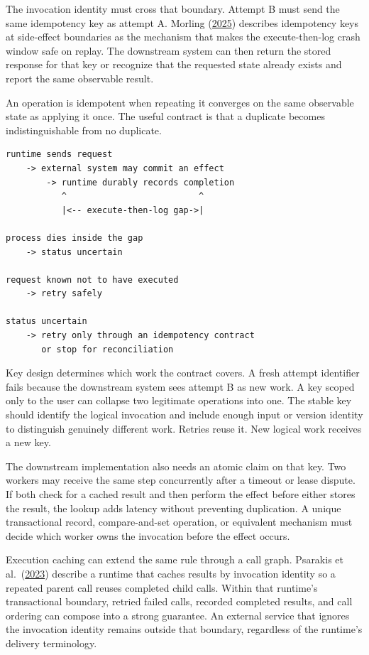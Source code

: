 The invocation identity must cross that boundary. Attempt B must send the same idempotency key as attempt A. Morling (\href{https://www.morling.dev/blog/building-durable-execution-engine-with-sqlite/}{2025}) describes idempotency keys at side-effect boundaries as the mechanism that makes the execute-then-log crash window safe on replay. The downstream system can then return the stored response for that key or recognize that the requested state already exists and report the same observable result.

An operation is idempotent when repeating it converges on the same observable state as applying it once. The useful contract is that a duplicate becomes indistinguishable from no duplicate.

\begin{verbatim}
runtime sends request
    -> external system may commit an effect
        -> runtime durably records completion
           ^                          ^
           |<-- execute-then-log gap->|

process dies inside the gap
    -> status uncertain

request known not to have executed
    -> retry safely

status uncertain
    -> retry only through an idempotency contract
       or stop for reconciliation
\end{verbatim}

Key design determines which work the contract covers. A fresh attempt identifier fails because the downstream system sees attempt B as new work. A key scoped only to the user can collapse two legitimate operations into one. The stable key should identify the logical invocation and include enough input or version identity to distinguish genuinely different work. Retries reuse it. New logical work receives a new key.

The downstream implementation also needs an atomic claim on that key. Two workers may receive the same step concurrently after a timeout or lease dispute. If both check for a cached result and then perform the effect before either stores the result, the lookup adds latency without preventing duplication. A unique transactional record, compare-and-set operation, or equivalent mechanism must decide which worker owns the invocation before the effect occurs.

Execution caching can extend the same rule through a call graph. Psarakis et al.~(\href{https://arxiv.org/abs/2312.06893}{2023}) describe a runtime that caches results by invocation identity so a repeated parent call reuses completed child calls. Within that runtime's transactional boundary, retried failed calls, recorded completed results, and call ordering can compose into a strong guarantee. An external service that ignores the invocation identity remains outside that boundary, regardless of the runtime's delivery terminology.

